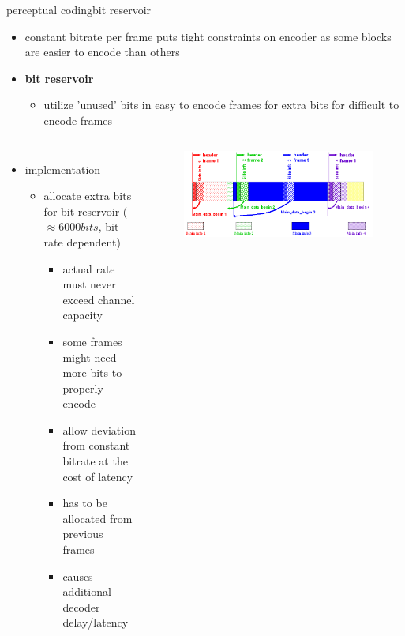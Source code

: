 	\begin{frame}{perceptual coding}{bit reservoir}
        \vspace{-3mm}
		\begin{itemize}
			\item	constant bitrate per frame puts tight constraints on encoder as some blocks are easier to encode than others
            \bigskip
            \item<2->[$\Rightarrow$] \textbf{bit reservoir}
                \begin{itemize}
                    \item utilize 'unused' bits in easy to encode frames for extra bits for difficult to encode frames
                \end{itemize}
		\end{itemize}
        \vspace{-5mm}
        \begin{columns}
		\begin{itemize}
            \item implementation
				\begin{itemize}
					\item	allocate extra bits for bit reservoir ($\approx 6000 bits$, bit rate dependent)
                        \begin{itemize}
                            \item   actual rate must never exceed channel capacity
                            \item   some frames might need more bits to properly encode
                            \item   allow deviation from constant bitrate at the cost of latency
                            \item   has to be allocated from previous frames 
                            \item   causes additional decoder delay/latency
                        \end{itemize}
				\end{itemize}
		\end{itemize}
                        \begin{figure}
                            \includegraphics[scale=.2]{graph/bit_reservoir}
                        \end{figure}
        \end{columns}
	\end{frame}
	
